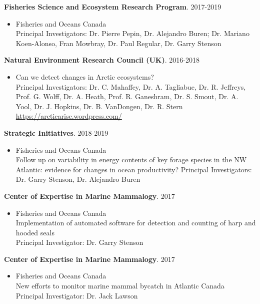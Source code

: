 \documentclass{res}
\begin{document}
\begin{resume}
\textbf{Fisheries Science and Ecosystem Research Program}. 2017-2019
\begin{itemize} %
	\item[] Fisheries and Oceans Canada\\
Principal Investigators: Dr. Pierre Pepin, Dr. Alejandro Buren; Dr. Mariano Koen-Alonso, Fran Mowbray, Dr. Paul Regular, Dr. Garry Stenson
\end{itemize}

\textbf{Natural Environment Research Council (UK)}. 2016-2018
\begin{itemize} %
	\item[] Can we detect changes in Arctic ecosystems?\\
Principal Investigators: Dr. C. Mahaffey, Dr. A. Tagliabue, Dr. R. Jeffreys, Prof. G. Wolff, Dr. A. Heath, Prof. R. Ganeshram, Dr. S. Smout, Dr. A. Yool, Dr. J. Hopkins, Dr. B. VanDongen, Dr. R. Stern \\
\url{https://arcticarise.wordpress.com/}
\end{itemize}

\textbf{Strategic Initiatives}. 2018-2019
\begin{itemize} %
	\item[] Fisheries and Oceans Canada\\
Follow up on variability in energy contents of key forage species in the NW Atlantic: evidence for changes in ocean productivity?
Principal Investigators: Dr. Garry Stenson, Dr. Alejandro Buren
\end{itemize}

\textbf{Center of Expertise in Marine Mammalogy}. 2017
\begin{itemize} %
	\item[] Fisheries and Oceans Canada\\
Implementation of automated software for detection and counting of harp and hooded seals \\
Principal Investigator: Dr. Garry Stenson
\end{itemize}

\textbf{Center of Expertise in Marine Mammalogy}. 2017
\begin{itemize} %
	\item[] Fisheries and Oceans Canada\\
New efforts to monitor marine mammal bycatch in Atlantic Canada\\
Principal Investigator: Dr. Jack Lawson
\end{itemize}


\end{resume}
\end{document}
